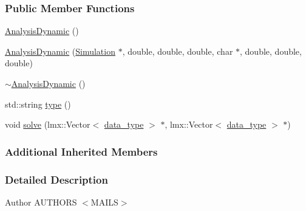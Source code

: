 \subsubsection*{Public Member Functions}
\begin{DoxyCompactItemize}
\item 
\hyperlink{classmknix_1_1_analysis_dynamic_a1457ddff8dfa14a90605248f4b953851}{Analysis\-Dynamic} ()
\item 
\hyperlink{classmknix_1_1_analysis_dynamic_a452203e81d27283089fe500b32c7ab55}{Analysis\-Dynamic} (\hyperlink{classmknix_1_1_simulation}{Simulation} $\ast$, double, double, double, char $\ast$, double, double, double)
\item 
\hyperlink{classmknix_1_1_analysis_dynamic_a85fd7662ea3228c608c6761ffc4e46d4}{$\sim$\-Analysis\-Dynamic} ()
\item 
std\-::string \hyperlink{classmknix_1_1_analysis_dynamic_a10045ff80be02d24dc08ad7da248844f}{type} ()
\item 
void \hyperlink{classmknix_1_1_analysis_dynamic_a43c9ab1907cb3cd72f3f4d605d2fa8ae}{solve} (lmx\-::\-Vector$<$ \hyperlink{namespacemknix_a16be4b246fbf2cceb141e3a179111020}{data\-\_\-type} $>$ $\ast$, lmx\-::\-Vector$<$ \hyperlink{namespacemknix_a16be4b246fbf2cceb141e3a179111020}{data\-\_\-type} $>$ $\ast$)
\end{DoxyCompactItemize}
\subsubsection*{Additional Inherited Members}


\subsubsection{Detailed Description}
\begin{DoxyAuthor}{Author}
A\-U\-T\-H\-O\-R\-S $<$\-M\-A\-I\-L\-S$>$ 
\end{DoxyAuthor}


